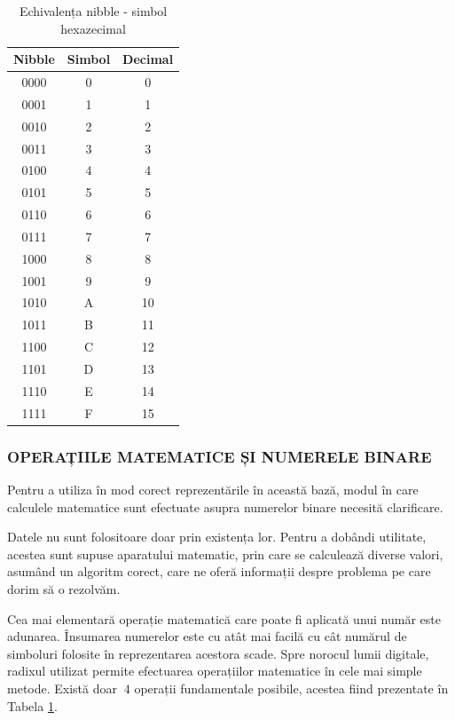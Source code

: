 \documentclass[12pt]{article}
\begin{document}
\begin{table}[h]
\centering
\caption{Echivalența nibble - simbol hexazecimal }
\label{Tabela:3}
\begin{tabular}{ ||c|c|c|| }
 \hline
 Nibble & Simbol & Decimal\\ 
 \hline  \hline
 0000 & 0 & 0\\
 \hline
 0001 & 1 & 1\\
 \hline
 0010 & 2 & 2\\
 \hline
 0011 &  3 & 3\\
 \hline
 0100 & 4 & 4\\
 \hline
 0101 & 5 & 5 \\
 \hline
 0110 & 6 & 6\\
 \hline
 0111 & 7 & 7\\
 \hline
 1000 & 8 & 8\\
 \hline
 1001 & 9 & 9\\
 \hline
 1010 & A & 10\\
 \hline
 1011 & B & 11\\
 \hline
 1100 & C & 12\\
 \hline
 1101 & D & 13\\
 \hline
 1110 & E & 14\\
 \hline
 1111 & F & 15\\
 \hline
\end{tabular}
\end{table}

\subsubsection{OPERAȚIILE MATEMATICE ȘI NUMERELE BINARE}
Pentru a utiliza în mod corect reprezentările în această bază, modul în care calculele matematice sunt efectuate asupra numerelor binare necesită clarificare.

Datele nu sunt folositoare doar prin existența lor. Pentru a dobândi utilitate, acestea sunt supuse aparatului matematic, prin care se calculează diverse valori, asumând un algoritm corect, care ne oferă informații despre problema pe care dorim să o rezolvăm.

Cea mai elementară operație matematică care poate fi aplicată unui număr este adunarea. Însumarea numerelor este cu atât mai facilă cu cât numărul de simboluri folosite în reprezentarea acestora scade. Spre norocul lumii digitale, radixul utilizat permite efectuarea operațiilor matematice în cele mai simple metode. Există doar $\ 4$ operații fundamentale posibile, acestea fiind prezentate în Tabela \ref{Tabela:3}.
\end{document}
